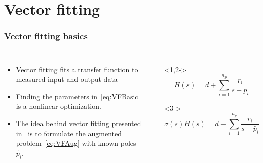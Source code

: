 \section[Theory]{Vector fitting}
\begin{frame}
	\frametitle{Vector fitting basics}
	\begin{columns}[c]
			\begin{itemize}
				\item<1-> Vector fitting fits a transfer function to measured input and output data
				\item<2-> Finding the parameters in~\eqref{eq:VFBasic} is a nonlinear optimization.
				\item<3-> The idea behind vector fitting presented in~\cite{gustavsen_rational_1999} is to formulate the augmented problem~\eqref{eq:VFAug} with known poles $\tilde{p_i}$.
			\end{itemize}
			\begin{itemize}
			\item[]<1,2-> 
				\begin{equation}
					\label{eq:VFBasic}
					H(s) = d + \sum^{n_p}_{i=1}\frac{r_i}{s-p_i}
				\end{equation}
			\item[]<3->
				\begin{equation}
					\label{eq:VFAug}
					\sigma(s)H(s) = d + \sum^{n_p}_{i=1}\frac{r_i}{s-\tilde{p_i}}
				\end{equation}
			\end{itemize}
	\end{columns}
\end{frame}
